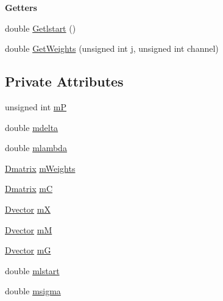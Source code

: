 \begin{Indent}\textbf{ Getters}\par
\begin{DoxyCompactItemize}
\item 
double \hyperlink{classtsa_1_1_r_l_s_canceler_a4387e7c608cb5f32932286caac5f3b43}{Getlstart} ()
\item 
double \hyperlink{classtsa_1_1_r_l_s_canceler_abcff7cc0ecfe6fda9be3f0c4a698ecb4}{Get\+Weights} (unsigned int j, unsigned int channel)
\end{DoxyCompactItemize}
\end{Indent}
\subsection*{Private Attributes}
\begin{DoxyCompactItemize}
\item 
unsigned int \hyperlink{classtsa_1_1_r_l_s_canceler_ac96db09b7154fb657b33325c7dcb0ba9}{mP}
\item 
double \hyperlink{classtsa_1_1_r_l_s_canceler_a689a06e01e97d29f98be6f37c2ac229d}{mdelta}
\item 
double \hyperlink{classtsa_1_1_r_l_s_canceler_a3c2ce539583693961306866f2d0d0b40}{mlambda}
\item 
\hyperlink{namespacetsa_ad260cd21c1891c4ed391fe788569aba4}{Dmatrix} \hyperlink{classtsa_1_1_r_l_s_canceler_a9abd498386c6750bfa22910242ace12e}{m\+Weights}
\item 
\hyperlink{namespacetsa_ad260cd21c1891c4ed391fe788569aba4}{Dmatrix} \hyperlink{classtsa_1_1_r_l_s_canceler_a5f45c202fd98fb28fc600747bda6d8e3}{mC}
\item 
\hyperlink{namespacetsa_a8900fb03d849baf447a1a0efe2561fb2}{Dvector} \hyperlink{classtsa_1_1_r_l_s_canceler_ac555ed3641b607e0818eb0d55d09e024}{mX}
\item 
\hyperlink{namespacetsa_a8900fb03d849baf447a1a0efe2561fb2}{Dvector} \hyperlink{classtsa_1_1_r_l_s_canceler_ab23f9b24f1909251587df0ec11218a4e}{mM}
\item 
\hyperlink{namespacetsa_a8900fb03d849baf447a1a0efe2561fb2}{Dvector} \hyperlink{classtsa_1_1_r_l_s_canceler_aca9845a6e34fb8ce588d9b8e7e44b489}{mG}
\item 
double \hyperlink{classtsa_1_1_r_l_s_canceler_a68cb1250ac509a8f038e6541b5b14c99}{mlstart}
\item 
double \hyperlink{classtsa_1_1_r_l_s_canceler_a290c458da793dc228fb0a2c2fc0cfd8a}{msigma}
\end{DoxyCompactItemize}


